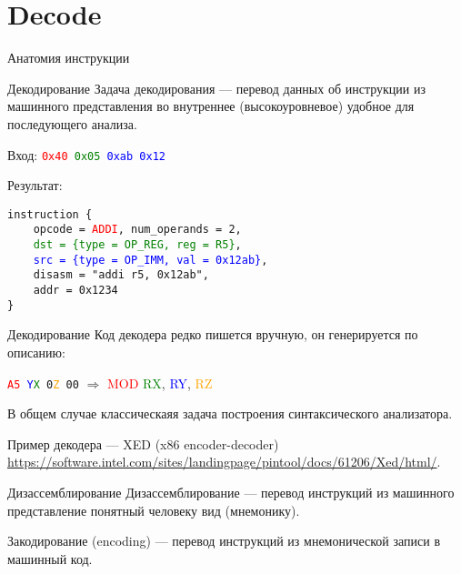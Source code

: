 \section{Decode}

\begin{frame}{Анатомия инструкции}
\centering
{}
\end{frame}

\begin{frame}{Декодирование}
Задача декодирования --- перевод данных об инструкции из машинного представления
во внутреннее (высокоуровневое) удобное для последующего анализа.

\pause

Вход: \texttt{\textcolor{red}{0x40} \textcolor{green}{0x05} \textcolor{blue}{0xab 0x12}}

Результат:

\texttt{instruction \{ \\
~~~~opcode = \textcolor{red}{ADDI}, num\_operands = 2, \\
~~~~\textcolor{green}{dst = \{type = OP\_REG, reg = R5\}}, \\
~~~~\textcolor{blue}{src = \{type = OP\_IMM, val = 0x12ab\}}, \\
~~~~disasm = "addi r5, 0x12ab", \\
~~~~addr = 0x1234 \\
\}}
\end{frame}

\begin{frame}{Декодирование}
Код декодера редко пишется вручную, он генерируется по описанию:

\texttt{\textcolor{red}{A5} \textcolor{blue}{Y}\textcolor{green}{X} 0\textcolor{orange}{Z} 00} $\Rightarrow$ \textcolor{red}{MOD} \textcolor{green}{RX}, \textcolor{blue}{RY}, \textcolor{orange}{RZ}

\pause\bigskip

В общем случае классическаяя задача построения  синтаксического анализатора.

\pause\bigskip

Пример декодера --- XED (x86 encoder-decoder) \url{https://software.intel.com/sites/landingpage/pintool/docs/61206/Xed/html/}.
\end{frame}

\begin{frame}{Дизассемблирование}
Дизассемблирование --- перевод инструкций из машинного представление понятный
человеку вид (мнемонику).

\pause\bigskip

Закодирование (encoding) --- перевод инструкций из мнемонической записи в
машинный код.
\end{frame}

